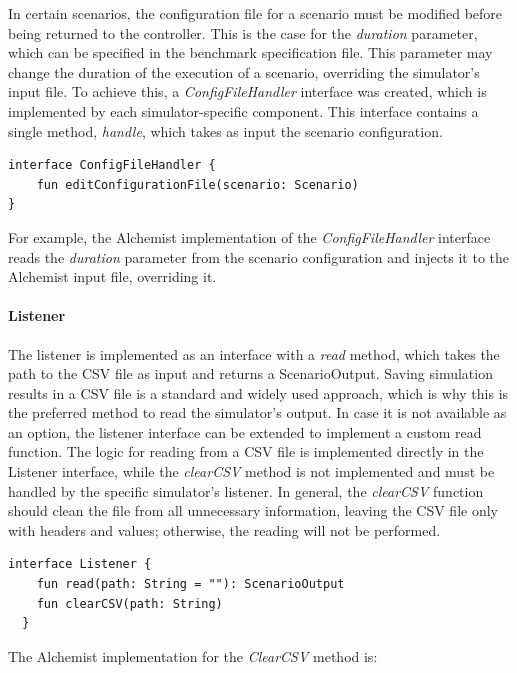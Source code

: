 \documentclass[12pt,a4paper,openright,twoside]{book}
\begin{document}
In certain scenarios, the configuration file for a scenario must be modified before being returned to the controller.
This is the case for the \emph{duration} parameter, which can be specified in the benchmark specification file.
This parameter may change the duration of the execution of a scenario, overriding the simulator's input file. 
To achieve this, a \emph{ConfigFileHandler} interface was created, which is implemented by each simulator-specific component.
This interface contains a single method, \emph{handle}, which takes as input the scenario configuration.

\begin{lstlisting}[style=my-kotlin, language=my-kotlin, caption={ConfigFileHandler interface.}]
  interface ConfigFileHandler {
    fun editConfigurationFile(scenario: Scenario)
}
\end{lstlisting}

For example, the Alchemist implementation of the \emph{ConfigFileHandler} interface reads the \emph{duration} parameter from the scenario configuration and injects it to the Alchemist input file, overriding it.

\paragraph*{Listener}
The listener is implemented as an interface with a \emph{read} method, which takes the path to the CSV file as input and returns a ScenarioOutput. 
Saving simulation results in a CSV file is a standard and widely used approach, which is why this is the preferred method to read the simulator's output. 
In case it is not available as an option, the listener interface can be extended to implement a custom read function. 
The logic for reading from a CSV file is implemented directly in the Listener interface, while the \emph{clearCSV} method is not implemented and must be handled by the specific simulator's listener. 
In general, the \emph{clearCSV} function should clean the file from all unnecessary information, leaving the CSV file only with headers and values; otherwise, the reading will not be performed.

\begin{lstlisting}[style=my-kotlin, language=my-kotlin, caption={Listener interface.}]
  interface Listener {
    fun read(path: String = ""): ScenarioOutput
    fun clearCSV(path: String)
  }
\end{lstlisting}

The Alchemist implementation for the \emph{ClearCSV} method is:
\end{document}

